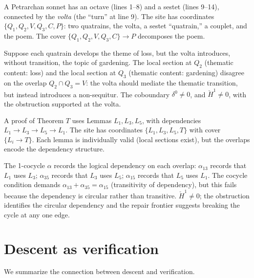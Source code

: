 \begin{example}
\label{ex:cech:poetry}
A Petrarchan sonnet has an octave (lines 1--8) and a sestet
(lines 9--14), connected by the \emph{volta} (the ``turn'' at line 9).
The site has coordinates $\{Q_1, Q_2, V, Q_3, C, P\}$: two quatrains,
the volta, a sestet ``quatrain,'' a couplet, and the poem.  The cover
$\{Q_1, Q_2, V, Q_3, C\} \to P$ decomposes the poem.

Suppose each quatrain develops the theme of loss, but the volta
introduces, without transition, the topic of gardening.  The local
section at $Q_2$ (thematic content: loss) and the local section at
$Q_3$ (thematic content: gardening) disagree on the overlap
$Q_2 \cap Q_3 = V$: the volta should mediate the thematic transition,
but instead introduces a non-sequitur.  The coboundary
$\delta^0 \neq 0$, and $\check{H}^1 \neq 0$, with the obstruction
supported at the volta.
\end{example}

\begin{example}
\label{ex:cech:math}
A proof of Theorem $T$ uses Lemmas $L_1, L_3, L_5$, with
dependencies $L_1 \to L_3 \to L_5 \to L_1$.  The site has coordinates
$\{L_1, L_3, L_5, T\}$ with cover $\{L_i \to T\}$.  Each lemma is
individually valid (local sections exist), but the overlaps encode
the dependency structure.

The 1-cocycle $\alpha$ records the logical dependency on each overlap:
$\alpha_{13}$ records that $L_1$ uses $L_3$; $\alpha_{35}$ records
that $L_3$ uses $L_5$; $\alpha_{15}$ records that $L_5$ uses $L_1$.
The cocycle condition demands $\alpha_{13} + \alpha_{35} = \alpha_{15}$
(transitivity of dependency), but this fails because the dependency
is circular rather than transitive.  $\check{H}^1 \neq 0$; the
obstruction identifies the circular dependency and the repair frontier
suggests breaking the cycle at any one edge.
\end{example}


\section{Descent as verification}
\label{sec:cech:descent-verification}

We summarize the connection between descent and verification.

